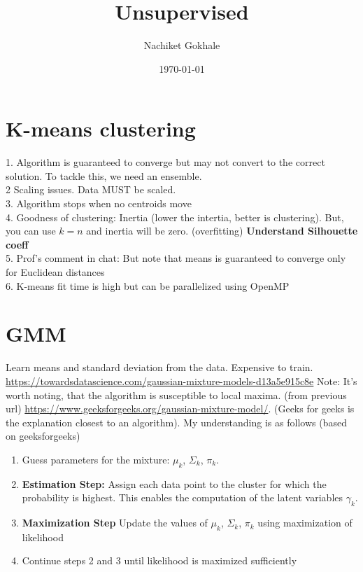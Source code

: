 \documentclass{article}
\begin{document}
\title{Unsupervised}
\author{Nachiket Gokhale}
\date{\today}
\maketitle
\section{K-means clustering}
1. Algorithm is guaranteed to converge but may not convert to the correct solution. To tackle this, we need an ensemble.\\
2 Scaling issues. Data MUST be scaled.\\
3. Algorithm stops when no centroids move\\
4. Goodness of clustering: Inertia (lower the intertia, better is clustering). But, you can use $k=n$ and inertia will be zero. (overfitting) \textbf{Understand Silhouette coeff}\\
5. Prof's comment in chat: But note that means is guaranteed to converge only for Euclidean distances\\
6. K-means fit time is high but can be parallelized using OpenMP


\section{GMM}
Learn means and standard deviation from the data. Expensive to train. \url{https://towardsdatascience.com/gaussian-mixture-models-d13a5e915c8e} Note: It’s worth noting, that the algorithm is susceptible to local maxima. (from previous url) \url{https://www.geeksforgeeks.org/gaussian-mixture-model/}. (Geeks for geeks is the explanation closest to an algorithm). My understanding is as follows (based on geeksforgeeks)

\begin{enumerate}
\item{Guess parameters for the mixture: $\mu_k$, $\Sigma_{k}$, $\pi_k$.}
\item{\textbf{Estimation Step:} Assign each data point to the cluster for which the probability is highest. This enables the computation of the latent variables $\gamma_k$.}
\item{\textbf{Maximization Step} Update the values of $\mu_k$, $\Sigma_{k}$, $\pi_k$ using maximization of likelihood}
\item{Continue steps 2 and 3 until likelihood is maximized sufficiently}  
\end{enumerate}
\end{document}
